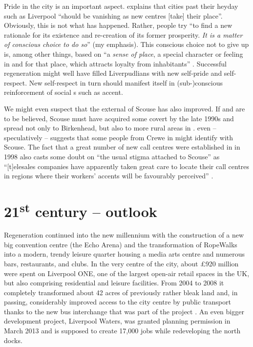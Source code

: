 Pride in the city is an important aspect.
\citet[20]{fraser2003} explains that cities past their heyday such as Liverpool ``should be vanishing as new centres [take] their place''.
Obviously, this is not what has happened.
Rather, people try ``to find a new rationale for its existence and re-creation of its former prosperity. \emph{It is a matter of conscious choice to do so}'' (my emphasis).
This conscious choice not to give up is, among other things, based on ``a \emph{sense of place}, a special character or feeling in and for that place, which attracts loyalty from inhabitants'' \citep[23, emphasis in the original]{fraser2003}.
Successful regeneration might well have filled Liverpudlians with new self-pride and self-respect.
New self-respect in turn should manifest itself in (sub-)conscious reinforcement of social s such as accent.

We might even suspect that the external  of Scouse has also improved.
If \citet[73]{trudgill1999} and \citet[110]{honeybone2007} are to be believed, Scouse must have acquired some covert  by the late 1990s and spread not only to Birkenhead, but also to more rural areas in .
\citet[176--177]{montgomery2007a} even -- speculatively -- suggests that some people from Crewe in  might identify with Scouse.
The fact that a great number of new call centres were established in  in 1998 also casts some doubt on ``the usual stigma attached to Scouse'' as ``[t]elesales companies have apparently taken great care to locate their call centres in regions where their workers' accents will be favourably perceived'' \citep[3]{foulkesdocherty1999a}.

	\section{21\textsuperscript{st} century -- outlook}\label{sec.hist.21}

Regeneration continued into the new millennium with the construction of a new big convention centre (the Echo Arena) and the transformation of RopeWalks into a modern, trendy leisure quarter housing a media arts centre and numerous bars, restaurants, and clubs.
In the very centre of the city, about £920 million were spent on Liverpool ONE, one of the largest open-air retail spaces in the UK, but also comprising residential and leisure facilities.
From 2004 to 2008 it completely transformed about 42 acres of previously rather bleak land and, in passing, considerably improved access to the city centre by public transport thanks to the new bus interchange that was part of the project \parencite[cf.][478--479]{murden2006}.
An even bigger development project, Liverpool Waters, was granted planning permission in March 2013 and is supposed to create 17,000 jobs while redeveloping the north docks.

